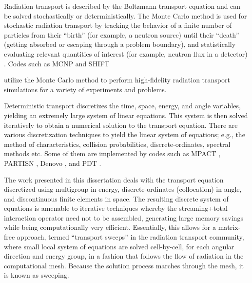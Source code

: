 Radiation transport is described by the Boltzmann transport equation \cite{bell_glasstone,zweifel,davison,duderstadt} and can be solved stochastically or deterministically.
The Monte Carlo method is used for stochastic radiation transport by tracking the behavior of a finite number of particles from their ``birth'' (for example, a neutron source) until their ``death'' (getting absorbed or escaping through a problem boundary), and statistically evaluating relevant quantities of interest (for example, neutron flux in a detector) \cite{shultis_mc}.
Codes such as MCNP \cite{MCNP} and SHIFT {\cite{shift} utilize the Monte Carlo method to perform high-fidelity radiation transport simulations for a variety of experiments and problems.

Deterministic transport discretizes the time, space, energy, and angle variables, yielding an extremely large system of linear equations. This system is then solved iteratively to obtain a numerical solution to the transport equation.
There are various discretization techniques to yield the linear system of equations; e.g., the method of characteristics, collision probabilities, discrete-ordinates, spectral methods etc. Some of them are  implemented by codes such as MPACT \cite{mpact}, PARTISN \cite{partisn}, Denovo \cite{denovo}, and PDT \cite{mpadams2013,mpadams2015,mpadamsjcp}.

The work presented in this dissertation deals with the transport equation discretized using multigroup in energy, discrete-ordinates (collocation) in angle, and discontinuous finite elements in space. The resulting discrete system of equations is amenable to iterative techniques whereby the streaming+total interaction operator need not to be assembled, generating large memory savings while being computationally very efficient.  Essentially, this allows for a matrix-free approach, termed ``transport sweeps'' in the radiation transport community, where small local system of equations are solved cell-by-cell, for each angular direction and energy group, in a fashion that follows the flow of radiation in the computational mesh.
Because the solution process marches through the mesh, it is known as sweeping.

}
